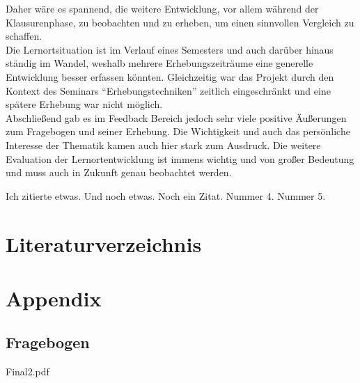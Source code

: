 \documentclass[11pt, a4paper]{article}
\begin{document}
Daher wäre es spannend, die weitere Entwicklung, vor allem während der Klausurenphase, zu beobachten und zu erheben, um einen sinnvollen Vergleich zu schaffen.\\
Die Lernortsituation ist im Verlauf eines Semesters und auch darüber hinaus ständig im Wandel, weshalb mehrere Erhebungszeiträume eine generelle Entwicklung besser erfassen könnten. Gleichzeitig war das Projekt durch den Kontext des Seminars “Erhebungstechniken” zeitlich eingeschränkt und eine spätere Erhebung war nicht möglich.\\
Abschließend gab es im Feedback Bereich jedoch sehr viele positive Äußerungen zum Fragebogen und seiner Erhebung. Die Wichtigkeit und auch das persönliche Interesse der Thematik kamen auch hier stark zum Ausdruck. Die weitere Evaluation der Lernortentwicklung ist immens wichtig und von großer Bedeutung und muss auch in Zukunft genau beobachtet werden.

\newpage
Ich zitierte etwas. \cite{.}
Und noch etwas. \cite{.31.01.2024}
Noch ein Zitat. \cite{TUDortmund.25.01.2024}
Nummer 4. \cite{TUDortmund.25.01.2024b}
Nummer 5. \cite{TUDortmund.26.01.2024}
\newpage
\section{Literaturverzeichnis}


\newpage
\section{Appendix}
\subsection{Fragebogen}

\begin{figure}[h]
	
\end{figure}
\pagestyle{plain}
\newpage
 {Final2.pdf}
\newpage
\end{document}
